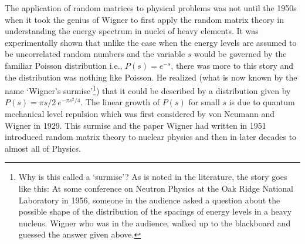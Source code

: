 \documentclass[11pt]{article}
\begin{document}
The application of random matrices to physical problems was not until the 1950s
when it took the genius of Wigner to first apply the random matrix theory 
in understanding the energy spectrum in nuclei of heavy elements. It was experimentally 
shown that unlike the case when the energy levels are assumed to be uncorrelated
random numbers and the variable $s$ would be governed by the familiar Poisson distribution i.e., $P(s) = e^{-s}$, 
there was more to this story and the distribution was nothing like Poisson. 
He realized (what is now known by the name `Wigner's surmise'\footnote{Why is this called a `surmise'? 
As is noted in the literature, the story goes like this: At some conference on Neutron Physics at the Oak 
Ridge National Laboratory in 1956, someone in the audience asked a question about the possible shape 
of the distribution of the spacings of energy levels in a heavy nucleus. Wigner who was in the audience, walked up to the blackboard and guessed the answer given above.}) that it could be described by a distribution given by $P(s) = \pi s/2~e^{-\pi s^2/4}$. 
The linear growth of $P(s)$ for small $s$ is due to quantum mechanical level repulsion 
which was first considered by von Neumann and Wigner in 1929. 
This surmise and the paper Wigner had written in 1951
\cite{Wigner1951OnTS} introduced random matrix theory 
to nuclear physics and then in later decades to almost all of Physics.
\end{document}
